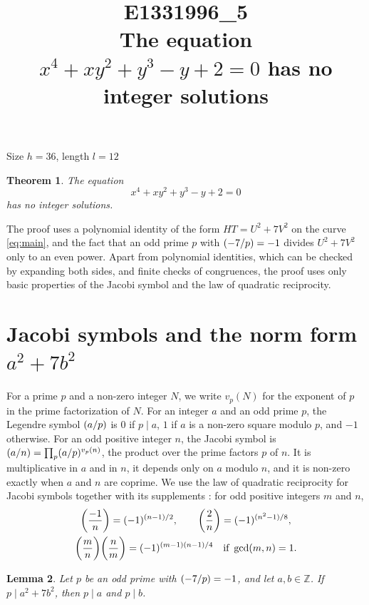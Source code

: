 \documentclass[11pt]{article}
\title{\textbf{E1331996\_5}\\[4pt] {\Large The equation $x^{4}+xy^{2}+y^{3}-y+2=0$ has no integer solutions}}
\author{}
\date{}
\newtheorem{theorem}{Theorem}
\newtheorem{lemma}[theorem]{Lemma}
\newcommand{\Z}{\mathbb{Z}}
\newcommand{\leg}[2]{\mathchoice{\biggl(\dfrac{#1}{#2}\biggr)}{(#1/#2)}{(#1/#2)}{(#1/#2)}}
\begin{document}
\maketitle
\vspace{-8ex}
\begin{center}
Size $h=36$, length $l=12$
\end{center}

\begin{theorem}\label{thm:main}
The equation
\begin{equation}\label{eq:main}
x^{4}+xy^{2}+y^{3}-y+2=0
\end{equation}
has no integer solutions.
\end{theorem}

The proof uses a polynomial identity of the form $HT=U^2+7V^2$ on the curve \eqref{eq:main}, and the fact that an odd prime $p$ with $\leg{-7}{p}=-1$ divides $U^2+7V^2$ only to an even power. Apart from polynomial identities, which can be checked by expanding both sides, and finite checks of congruences, the proof uses only basic properties of the Jacobi symbol and the law of quadratic reciprocity.

\section{\texorpdfstring{Jacobi symbols and the norm form $a^2+7b^2$}{Jacobi symbols and the norm form}}

For a prime $p$ and a non-zero integer $N$, we write $v_p(N)$ for the exponent of $p$ in the prime factorization of $N$. For an integer $a$ and an odd prime $p$, the Legendre symbol $\leg{a}{p}$ is $0$ if $p\mid a$, $1$ if $a$ is a non-zero square modulo $p$, and $-1$ otherwise. For an odd positive integer $n$, the Jacobi symbol is $\leg{a}{n}=\prod_p\leg{a}{p}^{v_p(n)}$, the product over the prime factors $p$ of $n$. It is multiplicative in $a$ and in $n$, it depends only on $a$ modulo $n$, and it is non-zero exactly when $a$ and $n$ are coprime. We use the law of quadratic reciprocity for Jacobi symbols together with its supplements \cite[Chapter~5, \S2]{IR}: for odd positive integers $m$ and $n$,
\begin{gather*}
\leg{-1}{n}=(-1)^{(n-1)/2},\qquad\leg{2}{n}=(-1)^{(n^2-1)/8},\\
\leg{m}{n}\leg{n}{m}=(-1)^{(m-1)(n-1)/4}\quad\text{if }\gcd(m,n)=1.
\end{gather*}

\begin{lemma}\label{lem:divides}
Let $p$ be an odd prime with $\leg{-7}{p}=-1$, and let $a,b\in\Z$. If $p\mid a^2+7b^2$, then $p\mid a$ and $p\mid b$.
\end{lemma}
\end{document}
